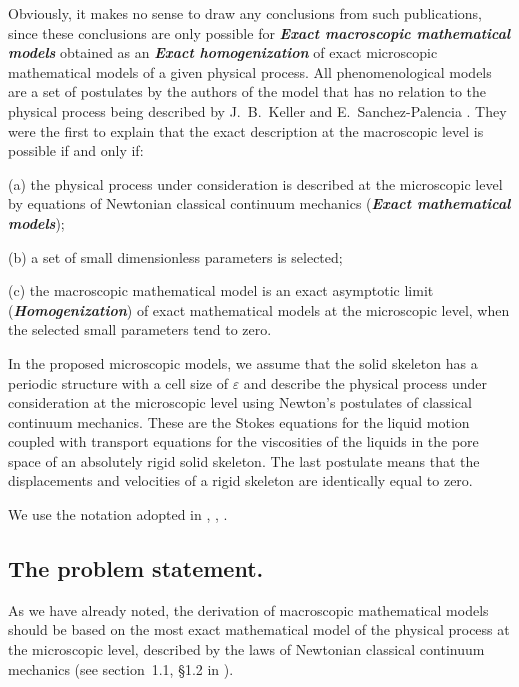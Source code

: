 \documentclass{article}
\theoremstyle{plain}
\theoremstyle{definition}
\numberwithin{equation}{section}
\begin{document}
Obviously, it makes no sense to draw any conclusions from such publications, since these conclusions are only possible for \textbf{\emph{Exact macroscopic mathematical models}} obtained as an \textbf{\emph{Exact homogenization}} of exact microscopic mathematical models of a given physical process. All phenomenological models are a set of postulates by the authors of the model that has no relation to the physical process being described by J.~B.~Keller \cite{2} and E.~Sanchez-Palencia \cite{20}. They were the first to explain that the exact description at the macroscopic level is possible if and only if:

(a) the physical process under consideration is described at the microscopic level by equations of Newtonian classical continuum mechanics (\textbf{\emph{Exact mathematical models}});

(b) a set of small dimensionless parameters is selected;

(c) the macroscopic mathematical model is an exact asymptotic limit (\textbf{\emph{Homogenization}}) of exact mathematical models at the microscopic level, when the selected small parameters tend to zero.

In the proposed microscopic models, we assume that the solid skeleton has a periodic structure with a cell size of $\varepsilon$ and describe the physical process under consideration at the microscopic level using Newton's postulates of classical continuum mechanics. These are the Stokes equations for the liquid motion coupled with transport equations for the viscosities of the liquids in the pore space of an absolutely rigid solid skeleton. The last postulate means that the displacements and velocities of a rigid skeleton are identically equal to zero.

We use the notation adopted in \cite{9}, \cite{10}, \cite{12}.

\subsection{The problem statement.}

As we have already noted, the derivation of macroscopic mathematical models should be based on the most exact mathematical model of the physical process at the microscopic level, described by the laws of Newtonian classical continuum mechanics (see section~1.1, \S 1.2 in \cite{14}).
\end{document}
